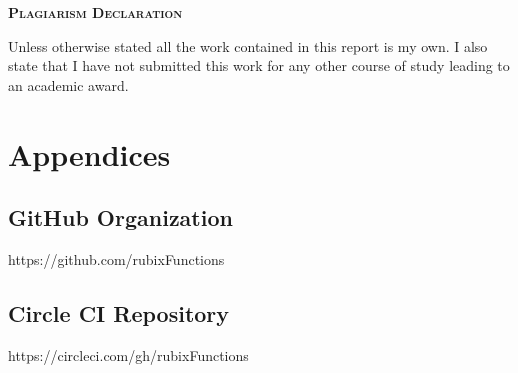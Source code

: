 \documentclass{article}
\begin{document}
\onehalfspacing
\hypersetup{pageanchor=false}

\hypersetup{pageanchor=true}
\clearpage
\begin{center}
\begin{minipage}{\textwidth}
  
  {\scshape\large \textbf{Plagiarism Declaration}\par}
  \vspace{1cm}
  Unless otherwise stated all the work contained in this report is my own.  I also state that I have not submitted this work for any other course of study leading to an academic award.
  
\end{minipage}
\end{center}
\vfill %
\clearpage

\newpage


\tableofcontents
\newpage
\listoffigures
\newpage
\listoftables
\newpage
\printglossaries

\newpage
{}


\newpage


\newpage


\newpage


\newpage


\newpage


\newpage



\newpage
\appendix
\section*{Appendices}
\renewcommand{\thesubsection}{\Alph{subsection}}

\subsection{GitHub Organization} 
\label{appendix:githuborg}
https://github.com/rubixFunctions

\subsection{Circle CI Repository} 
\label{appendix:circleci}
https://circleci.com/gh/rubixFunctions
\end{document}
